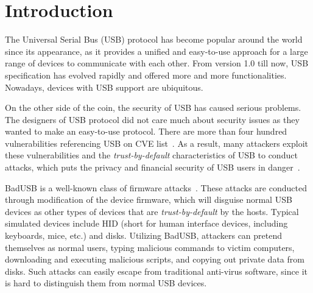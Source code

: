 \section{Introduction}
\label{sec:introduction}

The Universal Serial Bus (USB) protocol has become popular around the world since its appearance, as it provides a unified and easy-to-use approach for a large range of devices to communicate with each other.
From version 1.0 till now, USB specification has evolved rapidly and offered more and more functionalities.
Nowadays, devices with USB support are ubiquitous.

On the other side of the coin, the security of USB has caused serious problems.
The designers of USB protocol did not care much about security issues as they wanted to make an easy-to-use protocol.
There are more than four hundred vulnerabilities referencing USB on CVE list~\cite{website:CVE-list}.
As a result, many attackers exploit these vulnerabilities and the \textit{trust-by-default} characteristics of USB to conduct attacks, which puts the privacy and financial security of USB users in danger~\cite{sok}.

BadUSB is a well-known class of firmware attacks~\cite{badusb}.
These attacks are conducted through modification of the device firmware, which will disguise normal USB devices as other types of devices that are \textit{trust-by-default} by the hosts.
Typical simulated devices include HID (short for human interface devices, including keyboards, mice, etc.) and disks.
Utilizing BadUSB, attackers can pretend themselves as normal users, typing malicious commands to victim computers, downloading and executing malicious scripts, and copying out private data from disks.
Such attacks can easily escape from traditional anti-virus software, since it is hard to distinguish them from normal USB devices.

